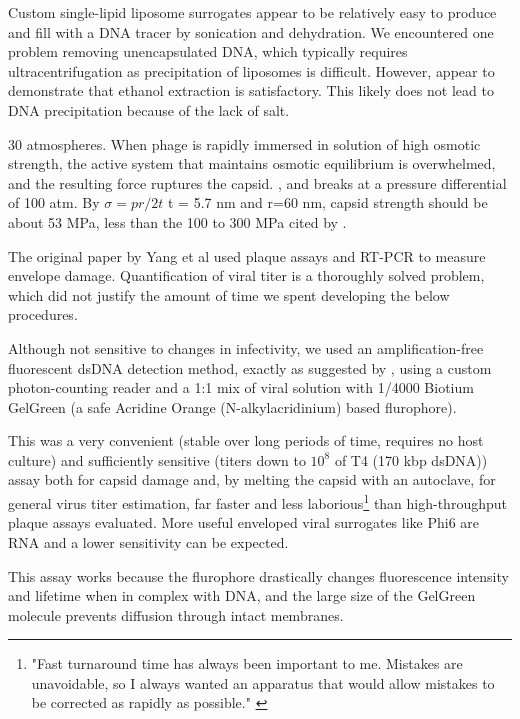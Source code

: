 \documentclass[paper.tex]{subfiles}
\begin{document}
\begin{multicols}{1}
Custom single-lipid liposome surrogates appear to be relatively easy to produce and fill with a DNA tracer by sonication and dehydration\cite{Encapsulation1982}\cite{OPTIMIZATION2017}\cite{Liposome2014}. We encountered one problem removing unencapsulated DNA, which typically requires ultracentrifugation as precipitation of liposomes is difficult. However, \cite{novela} appear to demonstrate that ethanol extraction is satisfactory. This likely does not lead to DNA precipitation because of the lack of salt. 

30 atmospheres. When phage is rapidly immersed in solution of high osmotic strength, the active system that maintains osmotic equilibrium is overwhelmed, and the resulting force ruptures the capsid. \cite{Osmotic2003}, and breaks at a pressure differential of 100 atm. By $\sigma = pr / 2t $ t = 5.7 nm\cite{Head1988} and r=60 nm, capsid strength should be about 53 MPa, less than the 100 to 300 MPa cited by \cite{Bacteriophage2004}.

The original paper by Yang et al used plaque assays and RT-PCR to measure envelope damage. Quantification of viral titer is a thoroughly solved problem, which did not justify the amount of time we spent developing the below procedures.

Although not sensitive to changes in infectivity, we used an amplification-free fluorescent dsDNA detection method, exactly as suggested by \cite{Quantification2020}, using a custom photon-counting reader and a 1:1 mix of viral solution with 1/4000 Biotium GelGreen (a safe Acridine Orange (N-alkylacridinium) based flurophore). 

This was a very convenient (stable over long periods of time, requires no host culture) and sufficiently sensitive (titers down to $10^8$ of T4 (170 kbp dsDNA)) assay both for capsid damage and, by melting the capsid with an autoclave, for general virus titer estimation, far faster and less laborious\footnote{"Fast turnaround time has always been important to me. Mistakes are unavoidable, so I always wanted an apparatus that would allow mistakes to be corrected as rapidly as possible." \cite{manipulation1998}} than high-throughput plaque assays evaluated\cite{Simple2018}\cite{Streamlining2018}. More useful enveloped viral surrogates like Phi6 are RNA and a lower sensitivity can be expected.\cite{Selected} 

This assay works because the flurophore drastically changes fluorescence intensity and lifetime when in complex with DNA\cite{SYBR2012}\cite{Characterization2010}, and the large size of the GelGreen molecule prevents diffusion through intact membranes.


\end{multicols}
\end{document}
